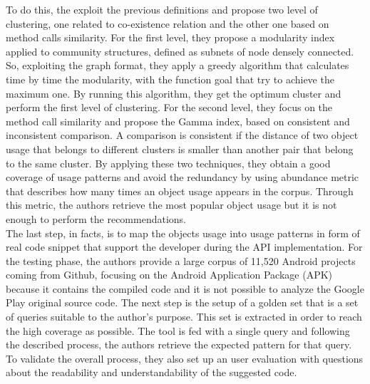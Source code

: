 To do this, the exploit the previous definitions and propose two level of clustering, one related to co-existence relation and the other one based on method calls similarity. For the first level, they propose a modularity index applied to community structures, defined as subnets of node densely connected. So, exploiting the graph format, they apply a greedy algorithm that calculates time by time the modularity, with the function goal that try to achieve the maximum one. By running this algorithm, they get the optimum cluster and perform the first level of clustering. For the second level, they focus on the method call similarity and propose the Gamma index, based on consistent and inconsistent comparison. A comparison is consistent if the distance of two object usage that belongs to different clusters is smaller than another pair that belong to the same cluster. By applying these two techniques, they obtain a good coverage of usage patterns and avoid the redundancy by using abundance metric that describes how many times an object usage appears in the corpus. Through this metric, the authors retrieve the most popular object usage but it is not enough to perform the recommendations. \\
The last step, in facts, is to map the objects usage into usage patterns in form of real code snippet that support the developer during the API implementation. For the testing phase, the authors provide a large corpus of 11,520 Android projects coming from Github, focusing on the Android Application Package (APK) because it contains the compiled code and it is not possible to analyze the Google Play original source code. The next step is the setup of a golden set that is a set of queries suitable to the author's purpose. This set is extracted in order to reach the high coverage as possible. The tool is fed with a single query and following the described process, the authors retrieve the expected pattern for that query. To validate the overall process, they also set up an user evaluation with questions about the readability and understandability of the suggested code.

